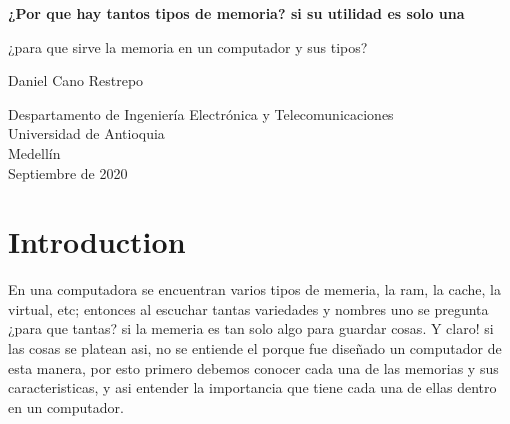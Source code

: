 \documentclass{article}
\begin{document}
\begin{titlepage}
    \begin{center}
        
        \huge
        \textbf{¿Por que hay tantos tipos de memoria? si su utilidad es solo una}
        \large 
        
        \vspace{1cm}
        ¿para que sirve la memoria en un computador y sus tipos?
        \vspace{4cm}
        
        Daniel Cano Restrepo
        
        \vspace{7.5cm}
        
        \small
        Despartamento de Ingeniería Electrónica y Telecomunicaciones\\
        Universidad de Antioquia\\
        Medellín\\
        Septiembre de 2020
        
    \end{center}
\end{titlepage}




\section{Introduction}
En una computadora se encuentran varios tipos de memeria, la ram, la cache, la virtual, etc; entonces al escuchar tantas variedades y nombres uno se pregunta ¿para que tantas? si la memeria es tan solo algo para guardar cosas. Y claro! si las cosas se platean asi, no se entiende el porque fue diseñado un computador de esta manera, por esto primero debemos conocer cada una de las memorias y sus caracteristicas, y asi entender la importancia que tiene cada una de ellas dentro en un computador.
\end{document}
